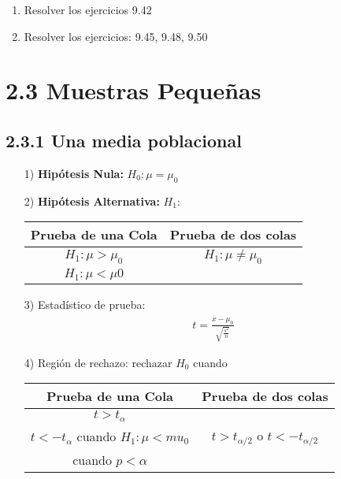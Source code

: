 \begin{frame}
\begin{frame}
\begin{Ejem}
\end{Ejem}
\begin{enumerate}
\item Resolver los ejercicios 9.42

\item Resolver los ejercicios: 9.45, 9.48, 9.50
\end{enumerate}





\section{2.3 Muestras Peque\~nas}

\subsection{2.3.1 Una media poblacional}




\begin{itemize}
\item[1) ] \textbf{Hip\'otesis Nula:} $H_{0}:\mu=\mu_{0}$
\item[2) ] \textbf{Hip\'otesis Alternativa: } $H_{1}:$
\begin{tabular}{cc}\hline
\textbf{Prueba de una Cola} & \textbf{Prueba de dos colas}\\\hline
$H_{1}:\mu>\mu_{0}$ & $H_{1}:\mu\neq \mu_{0}$\\ 
$H_{1}:\mu<\mu0$&\\
\end{tabular}
\item[3) ] Estad\'istico de prueba:
\begin{eqnarray*}
t=\frac{\overline{x}-\mu_{0}}{\sqrt{\frac{s^{2}}{n}}}
\end{eqnarray*}
\item[4) ] Regi\'on de rechazo: rechazar $H_{0}$ cuando
\begin{tabular}{cc}\hline
\textbf{Prueba de una Cola} & \textbf{Prueba de dos colas}\\\hline
$t>t_{\alpha}$ & \\
$t<-t_{\alpha}$ cuando $H_{1}:\mu<mu_{0}$&$t>t_{\alpha/2}$ o $t<-t_{\alpha/2}$\\
 cuando $p<\alpha$&\\
\end{tabular}
\end{itemize}






\end{frame}
\end{frame}
